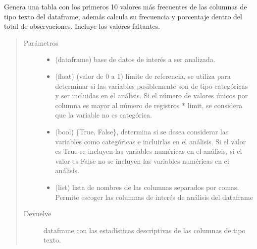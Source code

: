\documentclass[letterpaper,10pt,openany,spanish]{sphinxmanual}
\begin{document}
\begin{fulllineitems}
\label{\detokenize{datos:datos.unique_text}}
Genera una tabla con los primeros 10 valores más frecuentes de las columnas de tipo texto del dataframe, además calcula su frecuencia y porcentaje dentro del total de observaciones. Incluye los valores faltantes.
\begin{quote}\begin{description}
\item[{Parámetros}] \leavevmode\begin{itemize}
\item {} 
 \textendash{} (dataframe) base de datos de interés a ser analizada.

\item {} 
 \textendash{} (float) (valor de 0 a 1) límite de referencia, se utiliza para determinar si las variables posiblemente son de tipo categóricas y ser incluidas en el análisis. Si el número de valores únicos por columna es mayor al número de registros * limit, se considera que la variable no es categórica.

\item {} 
 \textendash{} (bool) \{True, False\}, determina si se desea considerar las variables como categóricas e incluirlas en el análisis. Si el valor es True se incluyen las variables numéricas en el análisis, si el valor es False no se incluyen las variables numéricas en el análisis.

\item {} 
 \textendash{} (list) lista de nombres de las columnas separados por comas. Permite escoger las columnas de interés de análisis del dataframe

\end{itemize}

\item[{Devuelve}] \leavevmode
dataframe con las estadísticas descriptivas de las columnas de tipo texto.

\end{description}\end{quote}

\end{fulllineitems}
\end{document}
